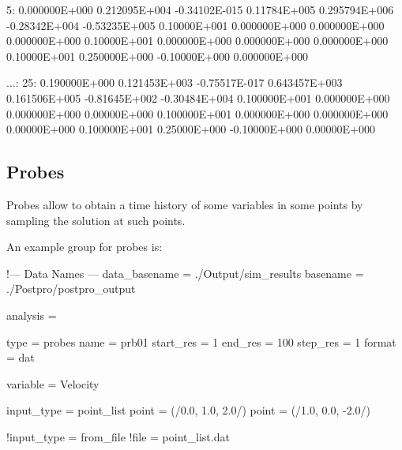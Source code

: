 \begin{inputfile}
  5: 0.000000E+000    0.212095E+004    -0.34102E-015  0.11784E+005  
     0.295794E+006    -0.28342E+004    -0.53235E+005  0.10000E+001  
     0.000000E+000    0.000000E+000    0.000000E+000  0.10000E+001  
     0.000000E+000    0.000000E+000    0.000000E+000  0.10000E+001  
     0.250000E+000    -0.10000E+000    0.000000E+000
  
...:
  25: 0.190000E+000  0.121453E+003 -0.75517E-017  0.643457E+003  
      0.161506E+005  -0.81645E+002 -0.30484E+004  0.100000E+001  
      0.000000E+000  0.000000E+000  0.00000E+000  0.100000E+001  
      0.000000E+000  0.000000E+000  0.00000E+000  0.100000E+001  
      0.25000E+000   -0.10000E+000  0.00000E+000
\end{inputfile}



\subsection{Probes}

Probes allow to obtain a time history of some variables in some points by sampling the solution at such points. 

An example  group for probes is:

\begin{inputfile}[frame=single, caption={dust\_post.in for probes}, label={file:dust_post.in_probes}]
!--- Data Names ---
data_basename = ./Output/sim_results
basename =     ./Postpro/postpro_output

analysis = {

type = probes
name = prb01
start_res = 1
end_res   = 100 
step_res  = 1
format = dat

variable = Velocity

input_type = point_list
point = (/0.0, 1.0, 2.0/)
point = (/1.0, 0.0, -2.0/)

!input_type = from_file
!file = point_list.dat

}
\end{inputfile}

